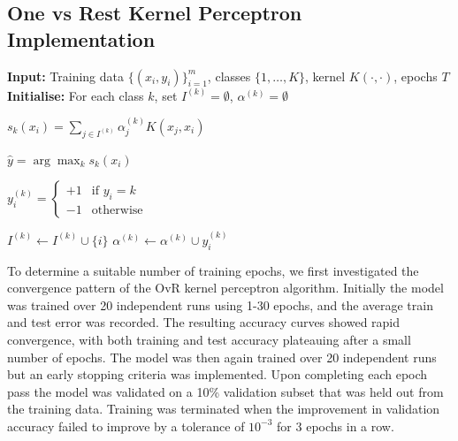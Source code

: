 \subsection{One vs Rest Kernel Perceptron Implementation}
\begin{algorithm}[H]
\caption{Online One-vs-Rest Kernel Perceptron}
\begin{algorithmic}[1]

\STATE \textbf{Input:} Training data $\{(x_i,y_i)\}_{i=1}^m$, classes $\{1,\dots,K\}$, kernel $K(\cdot,\cdot)$, epochs $T$
\STATE \textbf{Initialise:} For each class $k$, set $I^{(k)}=\emptyset$, $\alpha^{(k)}=\emptyset$

            \STATE $s_k(x_i)=\sum_{j\in I^{(k)}} \alpha_j^{(k)} K(x_j,x_i)$
        \ENDFOR

        \STATE $\hat{y}=\arg\max_k s_k(x_i)$ \quad {}

            \STATE
            $
            y_i^{(k)} =
            \begin{cases}
            +1 & \text{if } y_i = k \\
            -1 & \text{otherwise}
            \end{cases}
            $

                \STATE $I^{(k)} \leftarrow I^{(k)} \cup \{i\}$
                \STATE $\alpha^{(k)} \leftarrow \alpha^{(k)} \cup y_i^{(k)}$
            \ENDIF
        \ENDFOR
    \ENDFOR
\ENDFOR

\end{algorithmic}
\end{algorithm}

To determine a suitable number of training epochs, we first investigated the convergence pattern of the OvR kernel perceptron algorithm. Initially the model was trained over 20 independent runs using 1-30 epochs, and the average train and test error was recorded. The resulting accuracy curves showed rapid convergence, with both training and test accuracy plateauing after a small number of epochs. The model was then again trained over 20 independent runs but an early stopping criteria was implemented. Upon completing each epoch pass the model was validated on a 10\% validation subset that was held out from the training data. Training was terminated when the improvement in validation accuracy failed to improve by a tolerance of $10^{-3}$ for 3 epochs in a row.

